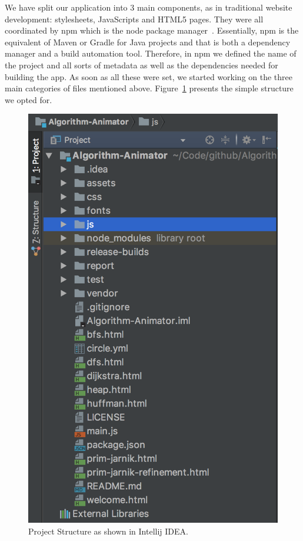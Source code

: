 \documentclass{l4proj}
\begin{document}
We have split our application into 3 main components, as in traditional website development: stylesheets, JavaScripts
and HTML5 pages. They were all coordinated by npm which is the node package manager~\cite{npm}. Essentially,
npm is the equivalent of Maven or Gradle for Java projects and that is both a dependency manager and a build automation
tool. Therefore, in npm we defined the name of the project and all sorts of metadata as well as the dependencies needed
for building the app. As soon as all these were set, we started working on the three main categories of files mentioned
above. Figure~\ref{fig:project-structure} presents the simple structure we opted for.
\begin{figure}[!ht]
    \centering
    \includegraphics[scale=0.4]{project-structure}
    \caption{Project Structure as shown in Intellij IDEA.}
    \label{fig:project-structure}
\end{figure}
\end{document}
